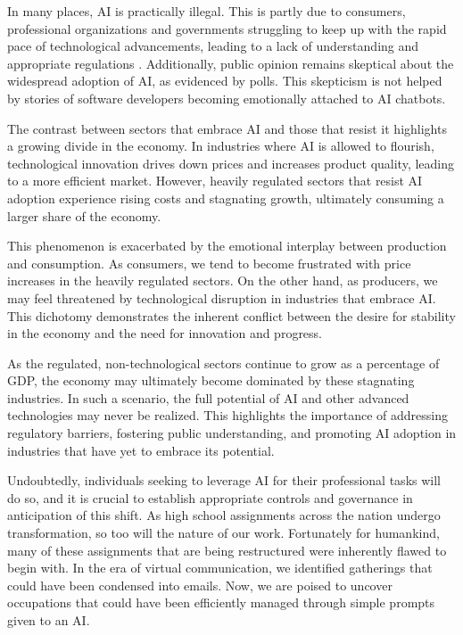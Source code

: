 In many places, AI is practically illegal. This is partly due to consumers, professional organizations and governments struggling to keep up with the rapid pace of technological advancements, leading to a lack of understanding and appropriate regulations . Additionally, public opinion remains skeptical about the widespread adoption of AI, as evidenced by polls. This skepticism is not helped by stories of software developers becoming emotionally attached to AI chatbots.

The contrast between sectors that embrace AI and those that resist it highlights a growing divide in the economy. In industries where AI is allowed to flourish, technological innovation drives down prices and increases product quality, leading to a more efficient market. However, heavily regulated sectors that resist AI adoption experience rising costs and stagnating growth, ultimately consuming a larger share of the economy.

This phenomenon is exacerbated by the emotional interplay between production and consumption. As consumers, we tend to become frustrated with price increases in the heavily regulated sectors. On the other hand, as producers, we may feel threatened by technological disruption in industries that embrace AI. This dichotomy demonstrates the inherent conflict between the desire for stability in the economy and the need for innovation and progress.

As the regulated, non-technological sectors continue to grow as a percentage of GDP, the economy may ultimately become dominated by these stagnating industries. In such a scenario, the full potential of AI and other advanced technologies may never be realized. This highlights the importance of addressing regulatory barriers, fostering public understanding, and promoting AI adoption in industries that have yet to embrace its potential.

Undoubtedly, individuals seeking to leverage AI for their professional tasks will do so, and it is crucial to establish appropriate controls and governance in anticipation of this shift. As high school assignments across the nation undergo transformation, so too will the nature of our work. Fortunately for humankind, many of these assignments that are being restructured were inherently flawed to begin with. In the era of virtual communication, we identified gatherings that could have been condensed into emails. Now, we are poised to uncover occupations that could have been efficiently managed through simple prompts given to an AI.

